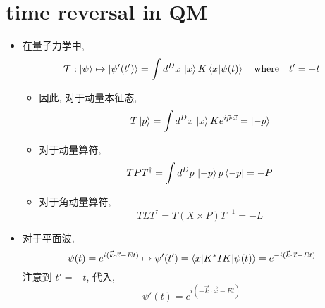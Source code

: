 \section{time reversal in QM}
\begin{itemize}
	\item 在量子力学中,
	\begin{equation}
		\mathcal{T} : \ket{\psi} \mapsto \ket{\psi'(t')} = \int d^D x \, \ket{x} K \braket{x | \psi(t)} \quad \text{where} \quad t' = - t
	\end{equation}
	\begin{itemize}
		\item 因此, 对于动量本征态,
		\begin{equation}
			T \ket{p} = \int d^D x \, \ket{x} K e^{i \vec{p} \cdot \vec{x}} = \ket{- p}
		\end{equation}
		
		\item 对于动量算符,
		\begin{equation}
			T P T^\dag = \int d^D p \, \ket{- p} p \bra{- p} = - P
		\end{equation}
		
		\item 对于角动量算符,
		\begin{equation}
			T L T^\dag = T (X \times P) T^{- 1} = - L
		\end{equation}
	\end{itemize}
	
	\item 对于平面波,
	\begin{equation}
		\psi(t) = e^{i (\vec{k} \cdot \vec{x} - E t)} \mapsto \psi'(t') = \braket{x | K^* I K | \psi(t)} = e^{- i (\vec{k} \cdot \vec{x} - E t)}
	\end{equation}
	注意到 $t' = - t$, 代入,
	\begin{equation}
		\psi'(t) = e^{i (- \vec{k} \cdot \vec{x} - E t)}
	\end{equation}
\end{itemize}

